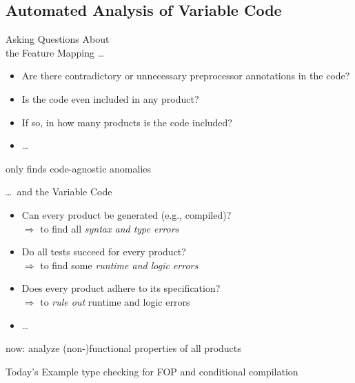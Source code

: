 \subsection{Automated Analysis of Variable Code}

\begin{frame}{\myframetitle}
	\begin{mycolumns}[t,widths={46}]
		\begin{example}{Asking Questions About\\the Feature Mapping \ldots}
			\begin{itemize}
				\item Are there contradictory or unnecessary preprocessor annotations in the code?
				\item Is the code even included in any product?
				\item If so, in how many products is the code included?
				\item \ldots
			\end{itemize}
		\end{example}
		\begin{note}{}
			only finds code-agnostic anomalies
		\end{note}
		\mynextcolumn
		\begin{example}{\ldots\ and the Variable Code}
			\begin{itemize}
				\item Can every product be generated (e.g., compiled)?\\
					$\Rightarrow$ to find all \emph{syntax and type errors}
				\item Do all tests succeed for every product?\\
					$\Rightarrow$ to find some \emph{runtime and logic errors}
				\item Does every product adhere to its specification?\\
					$\Rightarrow$ to \emph{rule out} runtime and logic errors
				\item \ldots
			\end{itemize}
		\end{example}
		\begin{note}{}
			now: analyze (non-)functional properties of all products
		\end{note}
		\begin{example}{Today's Example}
			type checking for FOP and conditional compilation
		\end{example}
	\end{mycolumns}
\end{frame}

